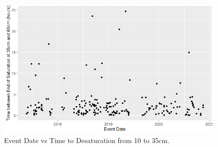 \begin{figure}[ht]
	\centering
	\includegraphics[width=\textwidth]{gfx/chapter-data-analysis/time_vs_drying_rate_10_35.png}
	\caption{Event Date vs Time to Desaturation from 10 to 35cm.}
	\label{fig:drying-rate-vs-time}
\end{figure}
